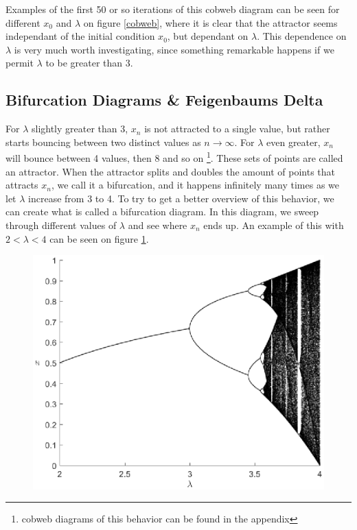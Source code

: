 \documentclass[12pt,oneside,a4paper]{article}
\numberwithin{equation}{section}
\begin{document}
{{{{Examples of the first 50 or so iterations of this cobweb diagram can be seen for different $x_0$ and $\lambda$ on figure \ref{cobweb}, where it is clear that the attractor seems independant of the initial condition $x_0$, but dependant on $\lambda$. This dependence on $\lambda$ is very much worth investigating, since something remarkable happens if we permit $\lambda$ to be greater than 3.
\subsection{Bifurcation Diagrams \& Feigenbaums Delta}
For $\lambda$ slightly greater than 3, $x_n$ is not attracted to a single value, but rather starts bouncing between two distinct values as $n \rightarrow \infty$. For $\lambda$ even greater, $x_n$ will bounce between 4 values, then 8 and so on \footnote{cobweb diagrams of this behavior can be found in the appendix}. These sets of points are called an attractor. When the attractor splits and doubles the amount of points that attracts $x_n$, we call it a bifurcation, and it happens infinitely many times as we let $\lambda$ increase from 3 to 4. To try to get a better overview of this behavior, we can create what is called a bifurcation diagram. In this diagram, we sweep through different values of $\lambda$ and see where $x_n$ ends up. An example of this with $2<\lambda<4$ can be seen on figure \ref{bifurcation}.

\begin{figure}
	\centering
	\includegraphics[width=0.8\linewidth]{Figures/Bifurcation}
	\caption{}
	\label{bifurcation}
\end{figure}


}}}}
\end{document}
